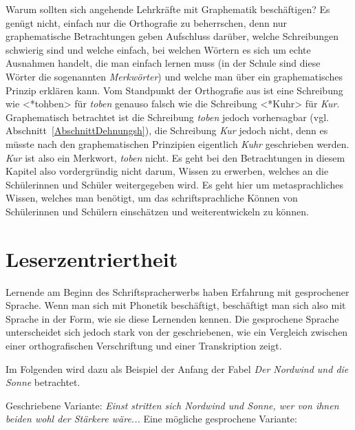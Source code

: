 Warum sollten sich angehende Lehrkräfte mit Graphematik beschäftigen? Es genügt nicht, einfach nur die Orthografie zu beherrschen, denn nur graphematische Betrachtungen geben Aufschluss darüber, welche Schreibungen schwierig sind und welche einfach, bei welchen Wörtern es sich um echte Ausnahmen handelt, die man einfach lernen muss (in der Schule sind diese Wörter die sogenannten \textit{Merkwörter}) und welche man über ein graphematisches Prinzip erklären kann. Vom Standpunkt der Orthografie aus ist eine Schreibung wie <*tohben> für \textit{toben} genauso falsch wie die Schreibung <*Kuhr> für \textit{Kur}. Graphematisch betrachtet ist die Schreibung \textit{toben} jedoch vorhersagbar (vgl. Abschnitt~\ref{AbschnittDehnungsh}), die Schreibung \textit{Kur} jedoch nicht, denn es müsste nach den graphematischen Prinzipien eigentlich \textit{Kuhr} geschrieben werden. \textit{Kur} ist also ein Merkwort, \textit{toben} nicht. Es geht bei den Betrachtungen in diesem Kapitel also vordergründig nicht darum, Wissen zu erwerben, welches an die Schülerinnen und Schüler weitergegeben wird. Es geht hier um metasprachliches Wissen, welches man benötigt, um das schriftsprachliche Können von Schülerinnen und Schülern einschätzen und weiterentwickeln zu können.



\section{Leserzentriertheit}\label{sec:Leserzentriertheit}

Lernende am Beginn des Schriftspracherwerbs haben Erfahrung mit gesprochener Sprache. Wenn man sich mit Phonetik beschäftigt, beschäftigt man sich also mit Sprache in der Form, wie sie diese Lernenden kennen. Die gesprochene Sprache unterscheidet sich jedoch stark von der geschriebenen, wie ein Vergleich zwischen einer orthografischen Verschriftung und einer Transkription zeigt.

Im Folgenden wird dazu als Beispiel der Anfang der Fabel \textit{Der Nordwind und die Sonne} betrachtet.

\ea \label{ea:Nordwind}
\ea \label{ea:Nordwindgeschrieben}     Geschriebene Variante: 
\textit{Einst stritten sich Nordwind und Sonne, wer von ihnen beiden wohl der Stärkere wäre...}
\ex \label{ex:Nordwindgesprochen}   Eine mögliche gesprochene Variante: 
\z 
\z 


